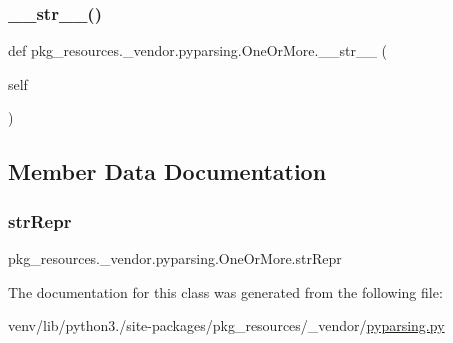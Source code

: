 \subsubsection{\texorpdfstring{\+\_\+\+\_\+str\+\_\+\+\_\+()}{\_\_str\_\_()}}
{\footnotesize\ttfamily def pkg\+\_\+resources.\+\_\+vendor.\+pyparsing.\+One\+Or\+More.\+\_\+\+\_\+str\+\_\+\+\_\+ (\begin{DoxyParamCaption}\item[{}]{self }\end{DoxyParamCaption})}



\subsection{Member Data Documentation}
\mbox{\label{classpkg__resources_1_1__vendor_1_1pyparsing_1_1OneOrMore_a23ad994bcaa63fcd8995c1a550ffceab}} 
\subsubsection{\texorpdfstring{str\+Repr}{strRepr}}
{\footnotesize\ttfamily pkg\+\_\+resources.\+\_\+vendor.\+pyparsing.\+One\+Or\+More.\+str\+Repr}



The documentation for this class was generated from the following file\+:\begin{DoxyCompactItemize}
\item 
venv/lib/python3./site-\/packages/pkg\+\_\+resources/\+\_\+vendor/\hyperlink{pkg__resources_2__vendor_2pyparsing_8py}{pyparsing.\+py}\end{DoxyCompactItemize}
